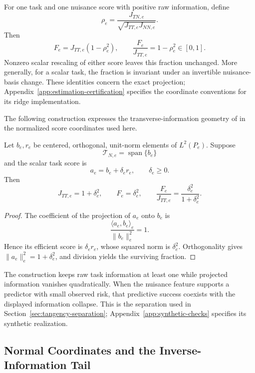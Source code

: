 For one task and one nuisance score with positive raw information, define
\[
\rho_e
=
\frac{J_{TN,e}}{\sqrt{J_{TT,e}J_{NN,e}}}.
\]
Then
\[
F_e
=
J_{TT,e}(1-\rho_e^2),
\qquad
\frac{F_e}{J_{TT,e}}
=
1-\rho_e^2
\in[0,1].
\tag{A.5}\label{eq:app-surviving-fraction}
\]
Nonzero scalar rescaling of either score leaves this fraction unchanged. More generally, for a scalar task, the fraction is invariant under an invertible nuisance-basis change. These identities concern the exact projection; Appendix~\ref{app:estimation-certification} specifies the coordinate conventions for its ridge implementation.

The following construction expresses the transverse-information geometry of \citet{mansouri_arai_2026_fisher_glasses} in the normalized score coordinates used here.

\begin{appendixproposition}
\label{prop:task-nuisance-tangency}

Let \(b_e,r_e\) be centered, orthogonal, unit-norm elements of \(L^2(P_e)\). Suppose
\[
\mathcal T_{N,e}
=
\operatorname{span}\{b_e\}
\]
and the scalar task score is
\[
a_e=b_e+\delta_er_e,
\qquad
\delta_e\ge0.
\]
Then
\[
J_{TT,e}=1+\delta_e^2,
\qquad
F_e=\delta_e^2,
\qquad
\frac{F_e}{J_{TT,e}}
=
\frac{\delta_e^2}{1+\delta_e^2}.
\tag{A.6}\label{eq:app-tangency-identities}
\]

\end{appendixproposition}
\begin{proof} The coefficient of the projection of \(a_e\) onto \(b_e\) is
\[
\frac{\langle a_e,b_e\rangle_e}{\|b_e\|_e^2}=1.
\]
Hence its efficient score is \(\delta_er_e\), whose squared norm is \(\delta_e^2\). Orthogonality gives \(\|a_e\|_e^2=1+\delta_e^2\), and division yields the surviving fraction. \end{proof}

The construction keeps raw task information at least one while projected information vanishes quadratically. When the nuisance feature supports a predictor with small observed risk, that predictive success coexists with the displayed information collapse. This is the separation used in Section~\ref{sec:tangency-separation}; Appendix~\ref{app:synthetic-checks} specifies its synthetic realization.

\subsection{Normal Coordinates and the Inverse-Information Tail}
\label{app:theory-tails}

